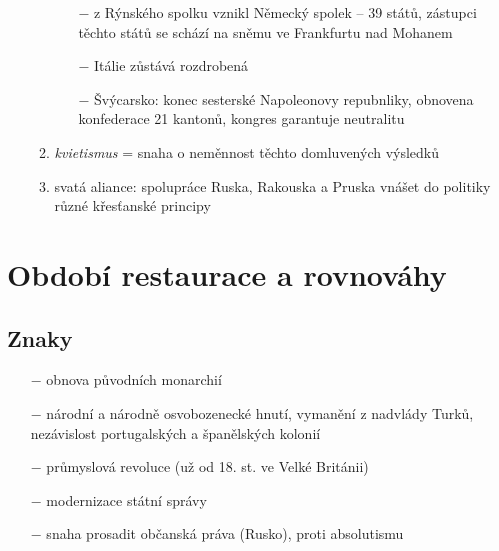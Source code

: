 \documentclass{article}
\begin{document}
\begin{itemize}
\begin{enumerate}
\begin{itemize}
            \item[$-$] z Rýnského spolku vznikl Německý spolek -- 39 států, zástupci těchto států se schází na sněmu ve Frankfurtu nad Mohanem
            \item[$-$] Itálie zůstává rozdrobená
            \item[$-$] Švýcarsko: konec sesterské Napoleonovy repubnliky, obnovena konfederace 21 kantonů, kongres garantuje neutralitu
        \end{itemize}
        \item \textit{kvietismus} = snaha o neměnnost těchto domluvených výsledků
        \item svatá aliance: spolupráce Ruska, Rakouska a Pruska vnášet do politiky různé křesťanské principy
    \end{enumerate}
\end{itemize}

\section*{Období restaurace a rovnováhy}

\subsection*{Znaky}
\begin{itemize}
    \vspace{-0.5em}
    \setlength\itemsep{0.15em}
    \item[$-$] obnova původních monarchií
    \item[$-$] národní a národně osvobozenecké hnutí, vymanění z nadvlády Turků, nezávislost portugalských a španělských kolonií
    \item[$-$] průmyslová revoluce (už od 18. st. ve Velké Británii)
    \item[$-$] modernizace státní správy
    \item[$-$] snaha prosadit občanská práva (Rusko), proti absolutismu
\end{itemize}
\end{document}
